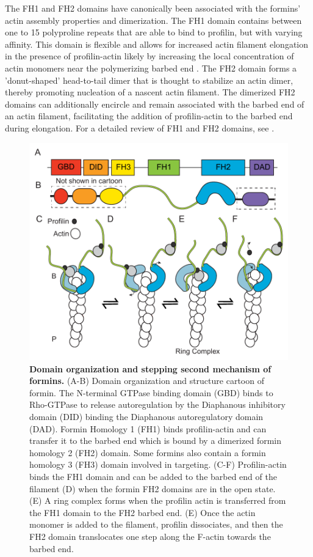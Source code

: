 The FH1 and FH2 domains have canonically been associated with the formins' actin assembly properties and dimerization. The FH1 domain contains between one to 15 polyproline repeats that are able to bind to profilin, but with varying affinity. This domain is flexible and allows for increased actin filament elongation in the presence of profilin-actin likely by increasing the local concentration of actin monomers near the polymerizing barbed end \citep{romero_formin_2004,goode_mechanism_2007}. The FH2 domain forms a 'donut-shaped' head-to-tail dimer that is thought to stabilize an actin dimer, thereby promoting nucleation of a nascent actin filament. The dimerized FH2 domains can additionally encircle and remain associated with the barbed end of an actin filament, facilitating the addition of profilin-actin to the barbed end during elongation. For a detailed review of FH1 and FH2 domains, see \citep{paul_review_2009}. 

\begin{figure}
\centering
\includegraphics[width=13cm]{img/ch01/formin_mech.pdf}
\caption[Domain organization and stepping second mechanism of formins.]{\textbf{Domain organization and stepping second mechanism of formins.} (A-B) Domain organization and structure cartoon of formin. The N-terminal GTPase binding domain (GBD) binds to Rho-GTPase to release autoregulation by the Diaphanous inhibitory domain (DID) binding the Diaphanous autoregulatory domain (DAD). Formin Homology 1 (FH1) binds profilin-actin and can transfer it to the barbed end which is bound by a dimerized formin homology 2 (FH2) domain. Some formins also contain a formin homology 3 (FH3) domain involved in targeting. (C-F) Profilin-actin binds the FH1 domain and can be added to the barbed end of the filament (D) when the formin FH2 domains are in the open state. (E) A ring complex forms when the profilin actin is transferred from the FH1 domain to the FH2 barbed end. (E) Once the actin monomer is added to the filament, profilin dissociates, and then the FH2 domain translocates one step along the F-actin towards the barbed end.} 
\label{fig:formin-domain}
\end{figure}

